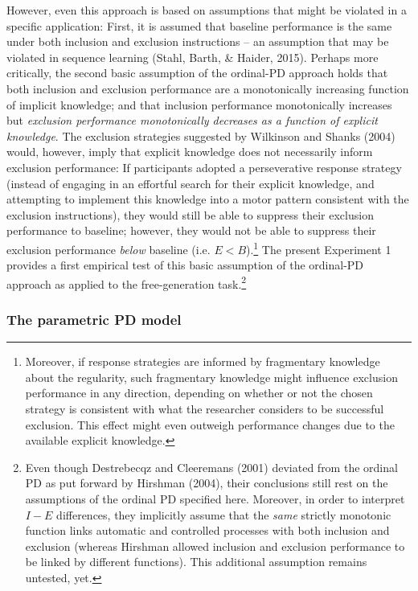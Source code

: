 \documentclass[man]{apa6}
\theoremstyle{definition}
\theoremstyle{definition}
\theoremstyle{definition}
\theoremstyle{remark}
\begin{document}
However, even this approach is based on assumptions that might be
violated in a specific application: First, it is assumed that baseline
performance is the same under both inclusion and exclusion instructions
-- an assumption that may be violated in sequence learning (Stahl,
Barth, \& Haider, 2015). Perhaps more critically, the second basic
assumption of the ordinal-PD approach holds that both inclusion and
exclusion performance are a monotonically increasing function of
implicit knowledge; and that inclusion performance monotonically
increases but \emph{exclusion performance monotonically decreases as a
function of explicit knowledge}. The exclusion strategies suggested by
Wilkinson and Shanks (2004) would, however, imply that explicit
knowledge does not necessarily inform exclusion performance: If
participants adopted a perseverative response strategy (instead of
engaging in an effortful search for their explicit knowledge, and
attempting to implement this knowledge into a motor pattern consistent
with the exclusion instructions), they would still be able to suppress
their exclusion performance to baseline; however, they would not be able
to suppress their exclusion performance \emph{below} baseline (i.e.
\(E < B\)).\footnote{Moreover, if response strategies are informed by
  fragmentary knowledge about the regularity, such fragmentary knowledge
  might influence exclusion performance in any direction, depending on
  whether or not the chosen strategy is consistent with what the
  researcher considers to be successful exclusion. This effect might
  even outweigh performance changes due to the available explicit
  knowledge.} The present Experiment 1 provides a first empirical test
of this basic assumption of the ordinal-PD approach as applied to the
free-generation task.\footnote{Even though Destrebecqz and Cleeremans
  (2001) deviated from the ordinal PD as put forward by Hirshman (2004),
  their conclusions still rest on the assumptions of the ordinal PD
  specified here. Moreover, in order to interpret \(I-E\) differences,
  they implicitly assume that the \emph{same} strictly monotonic
  function links automatic and controlled processes with both inclusion
  and exclusion (whereas Hirshman allowed inclusion and exclusion
  performance to be linked by different functions). This additional
  assumption remains untested, yet.}

\subsubsection{The parametric PD model}\label{the-parametric-pd-model}
\end{document}
